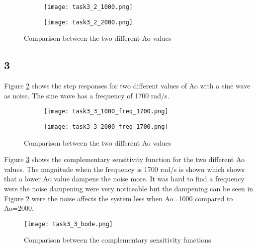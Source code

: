 \begin{figure}[H]
    \centering
    \begin{subfigure}[b]{0.45\textwidth}
        \texttt{[image: task3\_2\_1000.png]}
    \end{subfigure}
    \begin{subfigure}[b]{0.45\textwidth}
        \texttt{[image: task3\_2\_2000.png]}
    \end{subfigure}
	\caption{Comparison between the two different Ao values}
	\label{fig:task3_2_1000}
\end{figure}

\subsection*{3}

Figure \ref{fig:task3_3_1000_freq_1700} shows the step responses for two different values of Ao with a sine wave as noise. The sine wave has a frequency of 1700 rad/s.

\begin{figure}[H]
    \centering
    \begin{subfigure}[b]{0.45\textwidth}
        \texttt{[image: task3\_3\_1000\_freq\_1700.png]}
    \end{subfigure}
    \begin{subfigure}[b]{0.45\textwidth}
        \texttt{[image: task3\_3\_2000\_freq\_1700.png]}
    \end{subfigure}
	\caption{Comparison between the two different Ao values}
	\label{fig:task3_3_1000_freq_1700}
\end{figure}

Figure \ref{fig:task3_3_bode} shows the complementary sensitivity function for the two different Ao values. The magnitude when the frequency is 1700 rad/s is shown which shows that a lower Ao value dampens the noise more. It was hard to find a frequency were the noise dampening were very noticeable but the dampening can be seen in Figure \ref{fig:task3_3_1000_freq_1700} were the noise affects the system less when Ao=1000 compared to Ao=2000.

\begin{figure}[H]
	\begin{center}
	
		\texttt{[image: task3\_3\_bode.png]}
		\caption{Comparison between the complementary sensitivity functions}
		\label{fig:task3_3_bode}
	\end{center}
\end{figure}


%
